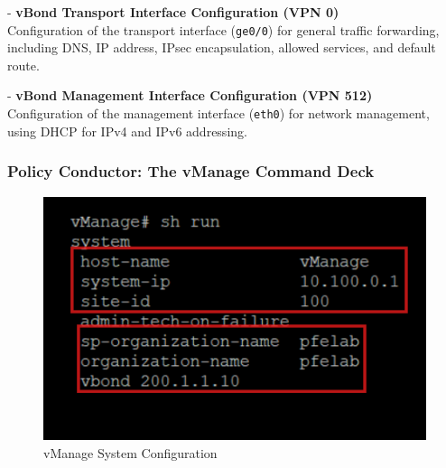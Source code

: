 \documentclass[12pt,english]{report}
\begin{document}
- \textbf{vBond Transport Interface Configuration (VPN 0)} \\
Configuration of the transport interface (\texttt{ge0/0}) for general traffic forwarding, including DNS, IP address, IPsec encapsulation, allowed services, and default route.

- \textbf{vBond Management Interface Configuration (VPN 512)} \\
Configuration of the management interface (\texttt{eth0}) for network management, using DHCP for IPv4 and IPv6 addressing.
\subsubsection{Policy Conductor: The vManage Command Deck}
\begin{figure}[H]
    \begin{minipage}[b]{0.6\textwidth} %
        \centering
        \includegraphics[width=\textwidth]{chapitre 3/18.png}
        \caption{vManage System Configuration}
        \label{fig:vManage System Configuration}
    \end{minipage}
    \hfill %
    \begin{minipage}[b]{0.30\textwidth} %
        \centering

\end{minipage}
\end{figure}
\end{document}
